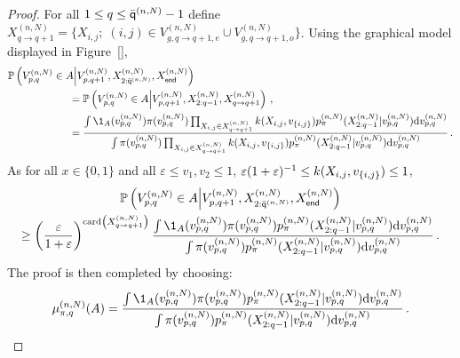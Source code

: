 \begin{proof}
For all $1\le q \le \bar{\mathsf{q}}^{(n,N)}-1$ define $X^{(n,N)}_{q\to q+1} = \{X_{i,j};\;(i,j)\in V^{(n,N)}_{g,q\to q+1,e}\cup V^{(n,N)}_{g,q\to q+1,o}\}$. Using the graphical model displayed in Figure~\ref{}, 
\begin{align*}
\mathbb{P}\left(V^{(n,N)}_{p,q}\in A\middle|V^{(n,N)}_{p,q+1},X_{2:\ordermax{n}{N}}^{(n,N)},X_{\mathsf{end}}^{(n,N)}\right) &\\
 &\hspace{-4.2cm}= \mathbb{P}\left(V^{(n,N)}_{p,q}\in A\middle|V^{(n,N)}_{p,q+1},X^{(n,N)}_{2:q-1},X^{(n,N)}_{q\to q+1}\right)\eqsp,\\
 &\hspace{-4.2cm}= \frac{\int \1_{A}(v^{(n,N)}_{p,q})\pi(v^{(n,N)}_{p,q})\prod_{X_{i,j}\in X^{(n,N)}_{q\to q+1}}\condlik(X_{i,j},v_{\{i,j\}})p_{\pi}^{(n,N)}(X^{(n,N)}_{2:q-1}|v^{(n,N)}_{p,q})\rmd v^{(n,N)}_{p,q}}{\int \pi(v^{(n,N)}_{p,q})\prod_{X_{i,j}\in X^{(n,N)}_{q\to q+1}}\condlik(X_{i,j},v_{\{i,j\}})p_{\pi}^{(n,N)}(X^{(n,N)}_{2:q-1}|v^{(n,N)}_{p,q})\rmd v^{(n,N)}_{p,q}}\eqsp.
\end{align*}
As for all $x\in\{0,1\}$ and all $\varepsilon\le v_1,v_2\le 1$, $\varepsilon(1+\varepsilon)^{-1}\le k(X_{i,j},v_{\{i,j\}})\le 1$,
\begin{multline*}
\mathbb{P}\left(V^{(n,N)}_{p,q}\in A\middle|V^{(n,N)}_{p,q+1},X_{2:\ordermax{n}{N}}^{(n,N)},X_{\mathsf{end}}^{(n,N)}\right)\\
\ge \left(\frac{\varepsilon}{1+\varepsilon}\right)^{\card\left(X^{(n,N)}_{q\to q+1}\right)}\frac{\int \1_{A}(v^{(n,N)}_{p,q})\pi(v^{(n,N)}_{p,q})p_{\pi}^{(n,N)}(X^{(n,N)}_{2:q-1}|v^{(n,N)}_{p,q})\rmd v^{(n,N)}_{p,q}}{\int \pi(v^{(n,N)}_{p,q})p_{\pi}^{(n,N)}(X^{(n,N)}_{2:q-1}|v^{(n,N)}_{p,q})\rmd v^{(n,N)}_{p,q}}\eqsp. 
\end{multline*}
The proof is then completed by choosing:
\[
\mu^{(n,N)}_{\pi,q}(A) = \frac{\int \1_{A}(v^{(n,N)}_{p,q})\pi(v^{(n,N)}_{p,q})p_{\pi}^{(n,N)}(X^{(n,N)}_{2:q-1}|v^{(n,N)}_{p,q})\rmd v^{(n,N)}_{p,q}}{\int \pi(v^{(n,N)}_{p,q})p_{\pi}^{(n,N)}(X^{(n,N)}_{2:q-1}|v^{(n,N)}_{p,q})\rmd v^{(n,N)}_{p,q}}\eqsp. 
\]
\end{proof}


